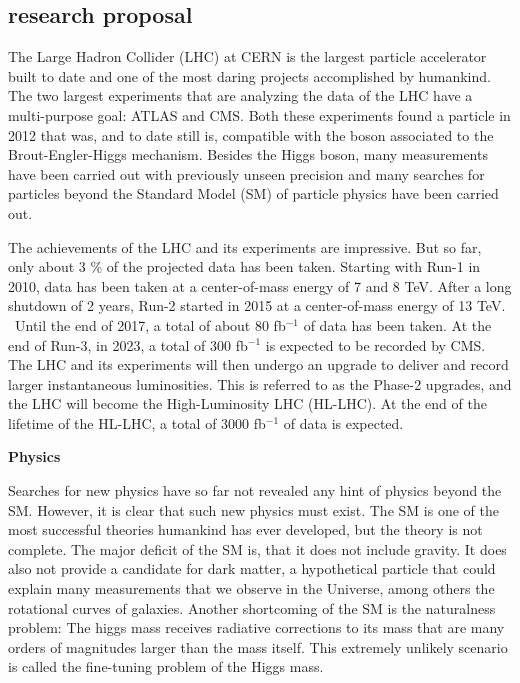 \documentclass[]{cv} %
\begin{document}
\begin{resume}
\end{resume}
\fi

\ifstatement
\begin{statement}

\section{research proposal}

The Large Hadron Collider (LHC) at CERN is the largest particle accelerator
built to date and one of the most daring projects accomplished by humankind. The
two largest experiments that are analyzing the data of the LHC have a
multi-purpose goal: ATLAS and CMS. Both these experiments found a particle in
2012 that was, and to date still is, compatible with the boson associated to the
Brout-Engler-Higgs mechanism. Besides the Higgs boson, many measurements have
been carried out with previously unseen precision and many searches for
particles beyond the Standard Model (SM) of particle physics have been carried
out.

The achievements of the LHC and its experiments are impressive. But so far, only
about 3 \% of the projected data has been taken. Starting with Run-1 in 2010,
data has been taken at a center-of-mass energy of 7 and 8 TeV. After a long
shutdown of 2 years, Run-2 started in 2015 at a center-of-mass energy of 13 TeV.
 Until the end of 2017, a total of about 80 fb$^{-1}$ of data has been taken. At
the end of Run-3, in 2023, a total of 300 fb$^{-1}$ is expected to be recorded
by CMS.  The LHC and its experiments will then undergo an upgrade to deliver and
record larger instantaneous luminosities. This is referred to as the Phase-2
upgrades, and the LHC will become the High-Luminosity LHC (HL-LHC). At the end
of the lifetime of the HL-LHC, a total of 3000 fb$^{-1}$ of data is expected.

\vspace{15pt}
\Large{}
\textbf{Physics}
\normalsize{}

Searches for new physics have so far not revealed any hint of physics beyond the
SM. However, it is clear that such new physics must exist. The SM is one of the
most successful theories humankind has ever developed, but the theory is not
complete. The major deficit of the SM is, that it does not include gravity. It
does also not provide a candidate for dark matter, a hypothetical particle that
could explain many measurements that we observe in the Universe, among others
the rotational curves of galaxies. Another shortcoming of the SM is the
naturalness problem: The higgs mass receives radiative corrections to its mass
that are many orders of magnitudes larger than the mass itself. This extremely
unlikely scenario is called the fine-tuning problem of the Higgs mass.


\end{statement}
\end{document}
